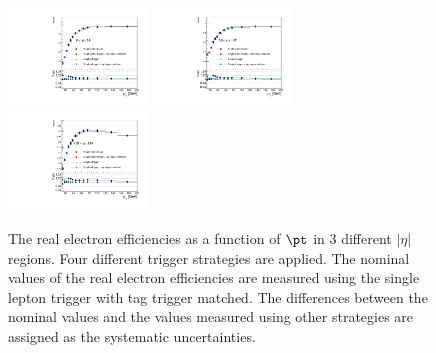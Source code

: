 \begin{figure}[htbp]
\includegraphics[width=0.33\textwidth]{trigger_uncertainty_electron_eta080_ratio_plot.pdf}
\includegraphics[width=0.33\textwidth]{trigger_uncertainty_electron_eta80137_ratio_plot.pdf}
\includegraphics[width=0.33\textwidth]{trigger_uncertainty_electron_eta152201_ratio_plot.pdf}
\caption{The real electron efficiencies as a function of $\pt$ in 3 different $|\eta|$ regions.
Four different trigger strategies are applied.
The nominal values of the real electron efficiencies are measured using the single lepton trigger with tag trigger matched.
The differences between the nominal values and the values measured using other strategies are assigned as the systematic uncertainties.}
\label{fig:RLE_trigger_bias_electron}
\end{figure}

